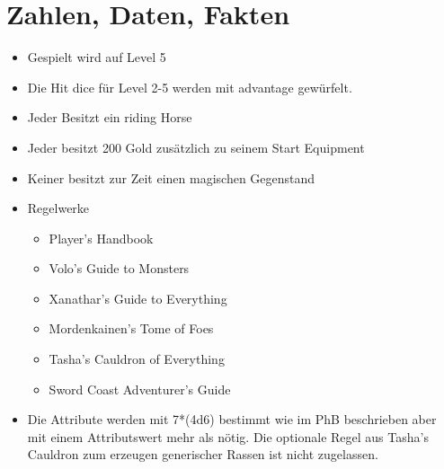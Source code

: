\documentclass[10pt,a4paper,onecolumn]{article}
\begin{document}
\section*{Zahlen, Daten, Fakten} 
\begin{itemize}
    \item Gespielt wird auf Level 5
    \item Die Hit dice für Level 2-5 werden mit advantage gewürfelt.
    \item Jeder Besitzt ein riding Horse
    \item Jeder besitzt 200 Gold zusätzlich zu seinem Start Equipment
    \item Keiner besitzt zur Zeit einen magischen Gegenstand
    \item Regelwerke    
    \begin{itemize} 
        \item Player's Handbook
        \item Volo's Guide to Monsters
        \item Xanathar's Guide to Everything
        \item Mordenkainen's Tome of Foes
        \item Tasha's Cauldron of Everything
        \item Sword Coast Adventurer's Guide       
    \end{itemize}
    \item Die Attribute werden mit 7*(4d6) bestimmt wie im PhB beschrieben 
        aber mit einem Attributswert mehr als nötig. Die optionale Regel 
        aus Tasha's Cauldron zum erzeugen generischer Rassen ist nicht zugelassen.


\end{itemize}
\end{document}
